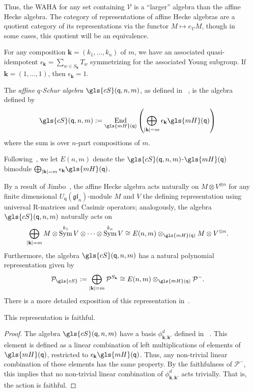 \documentclass[ALCO,ThmDefs,Unicode,epreuves]{cedram}
\DeclareMathOperator{\Sym}{Sym}
\DeclareMathOperator{\End}{End}
\newcommand{\wellsep}{\mathscr{V}}
\newcommand{\Bk}{\mathbf{k}}
\newcommand{\pq}{\mathsf{q}}
\newcommand{\cP}{\mathcal{P}}
\newcommand{\cS}{\gls{cS}}
\begin{document}
Thus, the WAHA for any set containing $\wellsep$ is a ``larger'' algebra than the affine Hecke
algebra. The category of representations of affine Hecke algebras are
a quotient category of its representations via the functor $M\mapsto e_{\wellsep}M$, though in some cases, this
quotient will be an equivalence. 

For any composition $\Bk=(k_1,\dots, k_n)$ of $m$, we have an associated
quasi-idempotent $\epsilon_{\Bk}=\sum_{w\in S_{\Bk}}T_w$ symmetrizing for the associated Young
subgroup. If $\Bk=(1,\dots, 1)$, then $\epsilon_{\Bk}=1$.

\begin{defi}\label{def:cS}
 The \emph{affine $q$-Schur algebra} $\cS(\pq,n,m)$, as defined in
~\cite[Def.~2.1.4]{GreenSchur}, is the algebra defined
 by
 \[\cS(\pq,n,m):=
 \End_{\gls{mH}(\pq)}\left(\bigoplus_{|\Bk|=m}\epsilon_{\Bk}\gls{mH}(\pq)
 \right)%
 \] where the sum is over $n$-part compositions of $m$.
\end{defi}
Following~\cite{GreenSchur}, we let $E(n,m)$ denote the $\cS(\pq,n,m)$-$\gls{mH}(\pq)$ bimodule $\bigoplus_{|\Bk|=m}\epsilon_{\Bk}\gls{mH}(\pq)$.


By a result of Jimbo~\cite{Jimbo}, the affine Hecke algebra acts naturally on $M\otimes V^{\otimes n}$ for any finite
dimensional $U_{\pq}(\mathfrak{gl}_n)$-module $M$ and $V$ the defining
representation using universal R-matrices and Casimir operators; analogously, the
algebra $\cS(\pq,n,m)$ naturally acts on
\[\bigoplus _{|\Bk|=m}M\otimes \Sym^{ k_1}V\otimes \cdots\otimes
\Sym^{k_n}V\cong E(n,m)\otimes_{\gls{mH}(\pq)}M\otimes V^{\otimes n}.\]
Furthermore, the algebra $\cS(\pq,n,m)$ has a natural 
polynomial representation given by
\[\cP_{\cS}:=\bigoplus_{|\Bk|=m}
 \cP^{S_{\Bk}}\cong E(n,m)\otimes_{\gls{mH}(\pq)}\cP^-.\]
There is a more detailed exposition of this representation in~\cite[\S~4]{MiSt}.
\begin{lemma}
 This representation is faithful.
\end{lemma}
\begin{proof}
 The algebra $\cS(\pq,n,m)$ have a basis $\phi^d_{\Bk,\Bk'}$ defined in
~\cite[Def.~2.2.3]{GreenSchur}. This element is defined as a linear
 combination of left multiplications of elements of $\gls{mH}(\pq)$,
 restricted to $\epsilon_{\Bk}\gls{mH}(\pq)$. Thus, any non-trivial linear
 combination of these elements has the same property.
 By the faithfulness of
 $\cP^-$, this implies that no non-trivial linear combination of
 $\phi^d_{\Bk,\Bk'}$ acts trivially. That is, the action is
 faithful. 
\end{proof}
\end{document}
